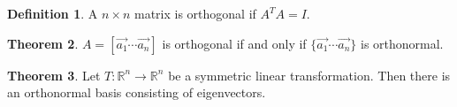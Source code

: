 \documentclass{article}
\theoremstyle{definition}
\newtheorem{theorem}{Theorem}[section]
\newtheorem{definition}[theorem]{Definition}
\theoremstyle{remark}
\begin{document}
\begin{definition}
    A $n\times n$ matrix is orthogonal if $A^T A=I$.
\end{definition}

\begin{theorem}
    $A=[\vec{a_1}\cdots\vec{a_n}]$ is orthogonal if and only if $\{\vec{a_1}\cdots\vec{a_n}\}$ is orthonormal.
\end{theorem}

\begin{theorem}
    Let $T:\mathbb{R}^n\rightarrow \mathbb{R}^n$ be a symmetric linear transformation. Then there is an orthonormal basis consisting of eigenvectors.
\end{theorem}
\end{document}
